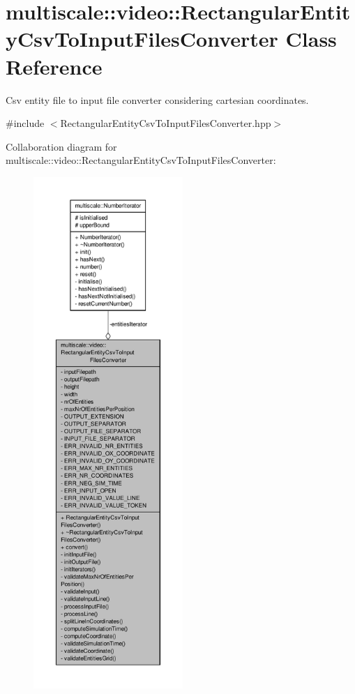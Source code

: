 \hypertarget{classmultiscale_1_1video_1_1RectangularEntityCsvToInputFilesConverter}{\section{multiscale\-:\-:video\-:\-:Rectangular\-Entity\-Csv\-To\-Input\-Files\-Converter Class Reference}
\label{classmultiscale_1_1video_1_1RectangularEntityCsvToInputFilesConverter}
}


Csv entity file to input file converter considering cartesian coordinates.  




{\ttfamily \#include $<$Rectangular\-Entity\-Csv\-To\-Input\-Files\-Converter.\-hpp$>$}



Collaboration diagram for multiscale\-:\-:video\-:\-:Rectangular\-Entity\-Csv\-To\-Input\-Files\-Converter\-:
\nopagebreak
\begin{figure}[H]
\begin{center}
\leavevmode
\includegraphics[height=550pt]{classmultiscale_1_1video_1_1RectangularEntityCsvToInputFilesConverter__coll__graph}
\end{center}
\end{figure}
